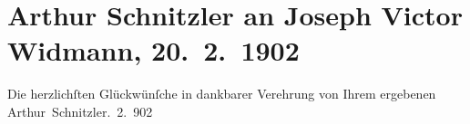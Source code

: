 

         
         \renewcommand{\erwaehntePersonen}{Personen: Joseph Victor Widmann}
         \renewcommand{\erwaehnteOrte}{Orte: Bern, Wien}
         \renewcommand{\erwaehnteWerke}{}
               \section[Arthur Schnitzler an Joseph Victor Widmann, 20. 2. 1902]{ Arthur Schnitzler an Joseph Victor Widmann, 20. 2. 1902}\nopagebreak{}\rehead{ }\begin{ledgroupsized}[t]{13cm}\normalsize\beginnumbering \toendnotes[C]{\smallbreak\pagebreak[2]} 
\pstart
           \noindent{}{\pb}Die herzlichſten Glückwünſche in dankbarer
               Verehrung von Ihrem ergebenen\pend
           \pstart \spacefill\mbox{Arthur Schnitzler}\pend{}. 2. 902\pend
           
         
         \endnumbering{}\end{ledgroupsized}  \newcommand{\dateiname}{L01204}\newcommand{\titel}{Arthur Schnitzler an Joseph Victor Widmann, 20. 2. 1902}\newcommand{\editorInnen}{Martin Anton Müller und Gerd-Hermann Susen}
      